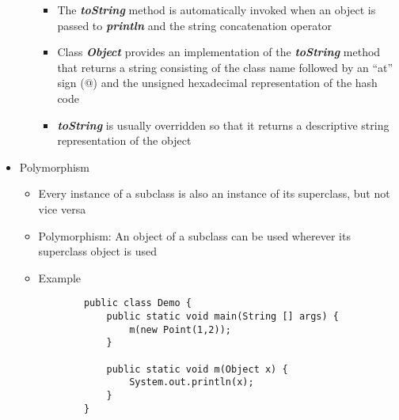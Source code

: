 \documentclass[11pt]{article}
\begin{document}
\begin{itemize}
\begin{itemize}
\begin{itemize}
					\item The \textbf{\textit{toString}} method is automatically invoked when an object is passed to \textbf{\textit{println}} and the string concatenation operator
					\item Class \textbf{\textit{Object}} provides an implementation of the \textbf{\textit{toString}} method that returns a string consisting of the class name followed by an “at” sign (@) and the unsigned hexadecimal representation of the hash code
					\item \textbf{\textit{toString }}is usually overridden so that it returns a descriptive string representation of the object
				\end{itemize}
		\end{itemize}


	\item Polymorphism
		\begin{itemize}
			\item Every instance of a subclass is also an instance of its superclass, but not vice versa
			\item Polymorphism: An object of a subclass can be used wherever its superclass object is used
			\item Example\\
\begin{minipage}{0.3\textwidth}
	\begin{Verbatim}
		public class Demo {
			public static void main(String [] args) {
				m(new Point(1,2));
			}

			public static void m(Object x) {
				System.out.println(x);
			}
		}
\end{Verbatim}
\end{minipage}
		\end{itemize}


\end{itemize}
\end{document}

